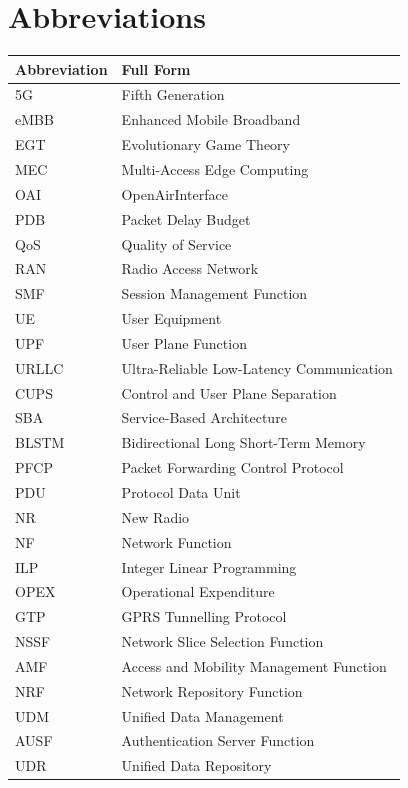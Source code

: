 \documentclass[conference]{IEEEtran}
\begin{document}
\section*{Abbreviations}
\begin{center}
\renewcommand{\arraystretch}{1.1}
\begin{tabular}{ll}
\hline
\textbf{Abbreviation} & \textbf{Full Form} \\
\hline
5G    & Fifth Generation \\
eMBB  & Enhanced Mobile Broadband \\
EGT   & Evolutionary Game Theory \\
MEC   & Multi-Access Edge Computing \\
OAI   & OpenAirInterface \\
PDB   & Packet Delay Budget \\
QoS   & Quality of Service \\
RAN   & Radio Access Network \\
SMF   & Session Management Function \\
UE    & User Equipment \\
UPF   & User Plane Function \\
URLLC & Ultra-Reliable Low-Latency Communication \\
CUPS  & Control and User Plane Separation \\
SBA   & Service-Based Architecture \\
BLSTM & Bidirectional Long Short-Term Memory \\
PFCP  & Packet Forwarding Control Protocol \\
PDU   & Protocol Data Unit \\
NR    & New Radio \\
NF    & Network Function \\
ILP   & Integer Linear Programming \\
OPEX  & Operational Expenditure \\
GTP   & GPRS Tunnelling Protocol \\
NSSF  & Network Slice Selection Function \\
AMF   & Access and Mobility Management Function \\
NRF   & Network Repository Function \\
UDM   & Unified Data Management \\
AUSF  & Authentication Server Function \\
UDR   & Unified Data Repository \\
\hline
\end{tabular}
\end{center}
\end{document}
